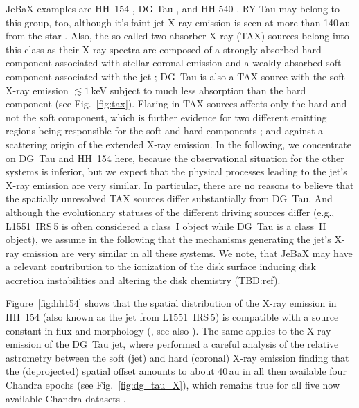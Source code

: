 JeBaX examples are
HH~154 \citep{Favata_2002,Favata_2006,Schneider_2011,Bonito_2011}, DG Tau \citep[see Fig.~\ref{fig:dg_tau_X};][]{Guedel_2005,Guedel_2008,Schneider_2008}, and HH 540 \citep{Kastner_2005}. RY Tau  may belong to this group, too,  although it's faint jet X-ray emission is seen at more than 140\,au from the star \citep{Skinner_2011}. Also, the so-called two absorber X-ray (TAX) sources belong into this class as their X-ray spectra are composed of a strongly absorbed hard component associated with stellar coronal emission and a weakly absorbed soft component associated with the jet \citep[][]{Guedel_2007}; DG~Tau is also a TAX source with the soft X-ray emission $\lesssim1$\,keV subject to much less absorption than the hard component (see Fig.~\ref{fig:tax}). Flaring in TAX sources affects only the hard and not the soft component, which is further evidence for two different emitting regions being responsible for the soft and hard components \citep{Guedel_2007}; and against a scattering origin of the extended X-ray emission. In the following, we concentrate on DG~Tau and HH~154 here, because 
the observational situation for the other systems is inferior, but we expect that the physical processes leading to the jet's X-ray emission are very similar. In particular, there are no reasons to believe that the spatially unresolved TAX sources differ substantially from DG~Tau.
And although the evolutionary statuses of the different driving sources differ (e.g., L1551~IRS\,5 is often considered a class~I object while DG~Tau is a class~II object), we assume in the following that the mechanisms generating the jet's X-ray emission are very similar in all these systems. We note,  that JeBaX may have a relevant contribution to the ionization of the disk surface inducing disk accretion instabilities \cite{Balbus_1991} and altering the disk chemistry \cite{Glassgold_2004} (TBD:ref).


Figure~\ref{fig:hh154} shows that the spatial distribution of the X-ray emission in HH~154 (also known as the jet from L1551~IRS\,5) is compatible with a source constant in flux and morphology  (\citealt{Schneider_2011}, see also \citealt{Bonito_2011}). The same applies to the  X-ray emission of the DG~Tau jet, where 
\citet{Schneider_2008} performed a careful analysis of the relative astrometry between the soft (jet) and hard (coronal) X-ray emission finding that the (deprojected) spatial offset amounts to about 40\,au in all then available four  Chandra  epochs (see Fig.~\ref{fig:dg_tau_X}), which remains true for all five now available Chandra datasets \citep{Guedel_2011}. 

